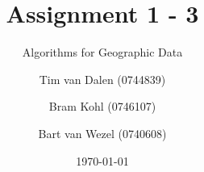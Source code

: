 \documentclass{beamer}
\title{Assignment 1 -  3}
\subtitle{Algorithms for Geographic Data}
\author[Dalen, Kohl, Wezel]{
	Tim van Dalen (0744839)
	\and
	Bram Kohl (0746107)
	\and
	Bart van Wezel (0740608)
}
\institute[Eindhoven University of Technology] %
{
    WIS\\
	Eindhoven University of Technology
}
\date{\today}
\begin{document}
	\begin{frame}
		\titlepage
	\end{frame}
	
	\begin{frame}
		\def\svgwidth{\textwidth}
		
	\end{frame}
	
	\begin{frame}
		\def\svgwidth{\textwidth}
		
	\end{frame}
\end{document}
